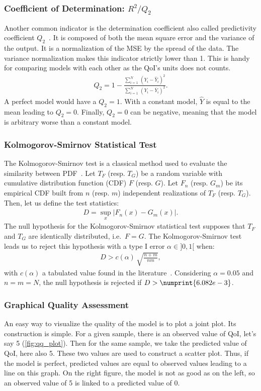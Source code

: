 \subsubsection{Coefficient of Determination: $R^2/Q_2$}
Another common indicator is the determination coefficient also called predictivity coefficient $Q_2$~\citep{marrel2009}. It is composed of both the mean square error and the variance of the output. It is a normalization of the MSE by the spread of the data. The variance normalization makes this indicator strictly lower than 1. This is handy for comparing models with each other as the QoI's units does not counts.
\begin{align} 
Q_{2} = 1 - \frac{\displaystyle\sum_{i = 1}^{N}\,\left(Y_i - \widehat{Y}_i\right)^2}{\displaystyle\sum_{i = 1}^{N}\,\left(Y_{i} - \overline{Y}_i\right)^2}.
\end{align}
A perfect model would have a $Q_2=1$. With a constant model, $\hat{Y}$ is equal to the mean leading to $Q_2=0$. Finally, $Q_2=0$ can be negative, meaning that the model is arbitrary worse than a constant model.

\subsubsection{Kolmogorov-Smirnov Statistical Test}

The Kolmogorov-Smirnov test is a classical method used to evaluate the similarity between PDF~\citep{clarke1992}. Let $T_F$ (resp. $T_G$) be a random variable with cumulative distribution function (CDF) $F$ (resp. $G$). Let $F_n$ (resp. $G_m$) be its empirical CDF built from $n$ (resp. $m$) independent realizations of $T_F$ (resp. $T_G$). Then, let us define the test statistics:
\begin{align}
D = \sup_{x} \lvert F_n(x) - G_m(x)\rvert.
\end{align}
The null hypothesis for the Kolmogorov-Smirnov statistical test supposes that $T_F$ and $T_G$ are identically distributed, i.e.~$F=G$. The Kolmogorov-Smirnov test leads us to reject this hypothesis with a type I error $\alpha\in]0,1[$ when:
\begin{align}
D > c(\alpha)\,\sqrt{\frac{n+m}{nm}}, \label{eq:nullhypothesis}
\end{align}
with $c(\alpha)$ a tabulated value found in the literature~\citep{smirnov1939}. Considering $\alpha = 0.05$ and $n = m = N$, the null hypothesis is rejected if $D > \numprint{6.082e-3}$.

\subsubsection{Graphical Quality Assessment}
An easy way to visualize the quality of the model is to plot a joint plot. Its construction is simple. For a given sample, there is an observed value of QoI, let's say 5 (\cref{fig:qq_plot}). Then for the same sample, we take the predicted value of QoI, here also 5. These two values are used to construct a scatter plot. Thus, if the model is perfect, predicted values are equal to observed values leading to a line on this graph. On the right figure, the model is not as good as on the left, so an observed value of 5 is linked to a predicted value of 0.

